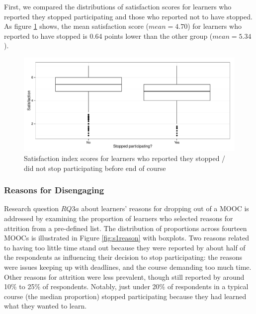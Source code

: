 \documentclass{sigchi}\usepackage[]{graphicx}\usepackage[]{color}
\makeatletter
\def\maxwidth{ %
  \ifdim\Gin@nat@width>\linewidth
    \linewidth
  \else
    \Gin@nat@width
  \fi
}
\newenvironment{kframe}{%
 \def\at@end@of@kframe{}%
 \ifinner\ifhmode%
  \def\at@end@of@kframe{\end{minipage}}%
  \begin{minipage}{\columnwidth}%
 \fi\fi%
 \def\FrameCommand##1{\hskip\@totalleftmargin \hskip-\fboxsep
 \colorbox{shadecolor}{##1}\hskip-\fboxsep
     \hskip-\linewidth \hskip-\@totalleftmargin \hskip\columnwidth}%
 \MakeFramed {\advance\hsize-\width
   \@totalleftmargin\z@ \linewidth\hsize
   \@setminipage}}%
 {\par\unskip\endMakeFramed%
 \at@end@of@kframe}
\newenvironment{knitrout}{}{} %
\makeatother
\begin{document}
First, we compared the distributions of satisfaction scores for learners who reported they stopped participating and those who reported not to have stopped. As figure \ref{fig:study1_satis_si_score_dist_comparison} shows, the mean satisfaction score ($mean=4.70$) for learners who reported to have stopped is 0.64 points lower than the other group ($mean=5.34$). 

\begin{knitrout}
\color{fgcolor}\begin{kframe}


{\ttfamily\noindent\color{warningcolor}{\#\# Warning: Removed 4 rows containing non-finite values (stat\_boxplot).}}\end{kframe}\begin{figure}[ht]

\includegraphics[width=\maxwidth]{figure/study1_satis_si_score_dist_comparison} \caption[Satisfaction index scores for learners who reported they stopped / did not stop participating before end of course]{Satisfaction index scores for learners who reported they stopped / did not stop participating before end of course\label{fig:study1_satis_si_score_dist_comparison}}
\end{figure}


\end{knitrout}


\subsubsection{Reasons for Disengaging}

Research question $RQ3a$ about learners' reasons for dropping out of a MOOC is addressed by examining the proportion of learners who selected reasons for attrition from a pre-defined list. The distribution of proportions across fourteen MOOCs is illustrated in Figure \ref{fig:s1reason} with boxplots. Two reasons related to having too little time stand out because they were reported by about half of the respondents as influencing their decision to stop participating: the reasons were issues keeping up with deadlines, and the course demanding too much time. Other reasons for attrition were less prevalent, though still reported by around 10\% to 25\% of respondents. Notably, just under 20\% of respondents in a typical course (the median proportion) stopped participating because they had learned what they wanted to learn.
\end{document}
